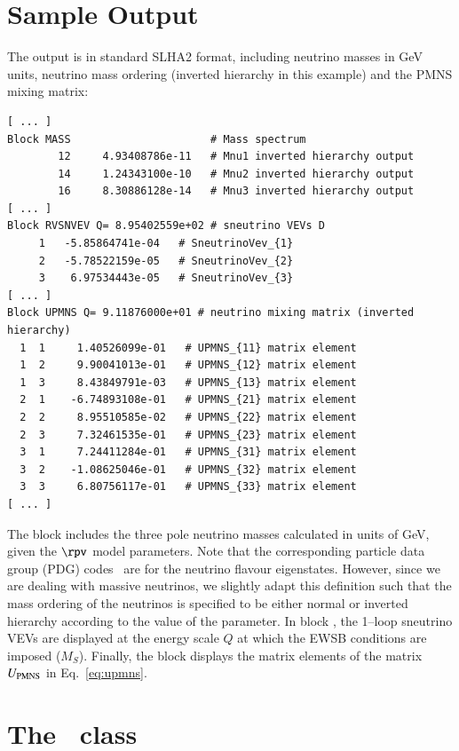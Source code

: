 \documentclass[pdflatex,final,3p,times]{elsarticle}
\begin{document}
\section{Sample Output \label{sec:output}}

The output is in standard SLHA2 format, including
neutrino masses in GeV units, neutrino mass 
ordering (inverted hierarchy 
in this example) and the PMNS mixing matrix: 
\small\begin{verbatim}
[ ... ]
Block MASS                      # Mass spectrum
        12     4.93408786e-11   # Mnu1 inverted hierarchy output
        14     1.24343100e-10   # Mnu2 inverted hierarchy output
        16     8.30886128e-14   # Mnu3 inverted hierarchy output
[ ... ]
Block RVSNVEV Q= 8.95402559e+02 # sneutrino VEVs D 
     1   -5.85864741e-04   # SneutrinoVev_{1}
     2   -5.78522159e-05   # SneutrinoVev_{2}
     3    6.97534443e-05   # SneutrinoVev_{3}
[ ... ]
Block UPMNS Q= 9.11876000e+01 # neutrino mixing matrix (inverted  hierarchy)
  1  1     1.40526099e-01   # UPMNS_{11} matrix element
  1  2     9.90041013e-01   # UPMNS_{12} matrix element
  1  3     8.43849791e-03   # UPMNS_{13} matrix element
  2  1    -6.74893108e-01   # UPMNS_{21} matrix element
  2  2     8.95510585e-02   # UPMNS_{22} matrix element
  2  3     7.32461535e-01   # UPMNS_{23} matrix element
  3  1     7.24411284e-01   # UPMNS_{31} matrix element
  3  2    -1.08625046e-01   # UPMNS_{32} matrix element
  3  3     6.80756117e-01   # UPMNS_{33} matrix element
[ ... ]
\end{verbatim}\normalsize

The block  includes the three pole neutrino masses
calculated in units of GeV, given the $\rpv$ model parameters.
Note that the corresponding particle data group (PDG) codes~\cite{pdg} are for
the 
neutrino flavour eigenstates. However, since we  
are dealing with massive neutrinos, we slightly adapt this definition such that the mass ordering of the
neutrinos is specified to be either normal or inverted hierarchy according to the value of the 
 parameter.
In block , the 1--loop sneutrino VEVs are displayed at the energy scale $Q$ at which 
the EWSB conditions are imposed ($M_S$).
Finally, the block  displays the matrix elements of the matrix
$U_{\rm PMNS}$ in Eq.~\ref{eq:upmns}.


\section{The ~class\label{sec:objects}}
\end{document}
